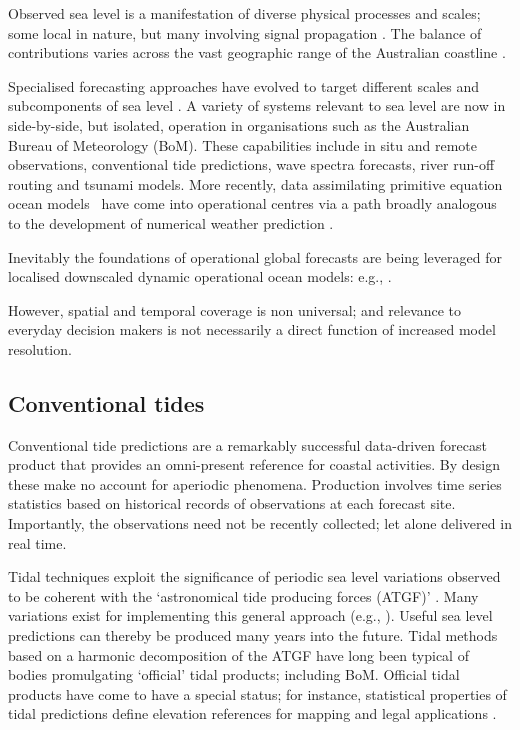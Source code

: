 Observed sea level is a manifestation of diverse physical processes and scales; some local in nature, but many involving signal propagation \citep{Melet:2016dd}.
The balance of contributions varies across the vast geographic range of the Australian coastline \citep{Haigh:2013bn,Haigh:2013he,Woodham:2013cl,Ridgway:2004kb,Church:1986tl,Allen:2009tf}.

Specialised forecasting approaches have evolved to target different scales and subcomponents of sea level \citep{Cartwright:2000tt,Petersen:2012kp}.
A variety of systems relevant to sea level are now in side-by-side, but isolated, operation in organisations such as the Australian Bureau of Meteorology (BoM). 
These capabilities include in situ and remote observations, conventional tide predictions, wave spectra forecasts, river run-off routing and tsunami models. 
More recently, data assimilating primitive equation ocean models~\citep{Schiller:2011di} have come into operational centres via a path broadly analogous to the development of numerical weather prediction \citep{Harper:kb}. 

Inevitably the foundations of operational global forecasts are being leveraged for localised downscaled dynamic operational ocean models: e.g., \citep{Paramygin:2017dx,Yang:2016ep,Wei:2014ex,Peng:2014kq}.

However, spatial and temporal coverage is non universal; and relevance to everyday decision makers is not necessarily a direct function of increased model resolution.  


\subsection{Conventional tides}
\label{sec:tide_intro}

Conventional tide predictions are a remarkably successful data-driven forecast product that provides an omni-present reference for coastal activities.
By design these make no account for aperiodic phenomena. 
Production involves time series statistics based on historical records of observations at each forecast site.
Importantly, the observations need not be recently collected; let alone delivered in real time.

Tidal techniques exploit the significance of periodic sea level variations observed to be coherent with the `astronomical tide producing forces (ATGF)' \citep{Hendershott:1981ub}.     
Many variations exist for implementing this general approach (e.g., \citep{Foreman:2009bg,Groves:1975ky,LEFFLER:2009ej,Smith:1997ut} ). 
Useful sea level predictions can thereby be produced many years into the future.  
Tidal methods based on a harmonic decomposition of the ATGF have long been typical of bodies promulgating `official' tidal products; including BoM.
Official tidal products have come to have a special status; for instance, statistical properties of tidal predictions define elevation references for mapping and legal applications \citep{PCTMSL-sp9}.


